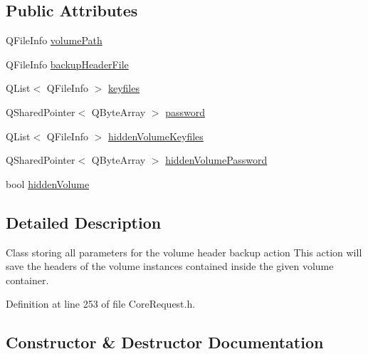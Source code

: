 \subsection*{Public Attributes}
\begin{DoxyCompactItemize}
\item 
Q\+File\+Info \hyperlink{struct_gost_crypt_1_1_core_1_1_backup_header_request_aa29012df2d35f163a525f2577f30ab49}{volume\+Path}
\item 
Q\+File\+Info \hyperlink{struct_gost_crypt_1_1_core_1_1_backup_header_request_af4c3d198df0113a58aede9649531bdf2}{backup\+Header\+File}
\item 
Q\+List$<$ Q\+File\+Info $>$ \hyperlink{struct_gost_crypt_1_1_core_1_1_backup_header_request_ae4b462b66c72cf07ef34574b6010f7fb}{keyfiles}
\item 
Q\+Shared\+Pointer$<$ Q\+Byte\+Array $>$ \hyperlink{struct_gost_crypt_1_1_core_1_1_backup_header_request_ae39396d46337be4935700059ed382916}{password}
\item 
Q\+List$<$ Q\+File\+Info $>$ \hyperlink{struct_gost_crypt_1_1_core_1_1_backup_header_request_a775c66c416d8fe75c6c446d3b9fd29ac}{hidden\+Volume\+Keyfiles}
\item 
Q\+Shared\+Pointer$<$ Q\+Byte\+Array $>$ \hyperlink{struct_gost_crypt_1_1_core_1_1_backup_header_request_aeed0cedac234914000bedb7b3d00425c}{hidden\+Volume\+Password}
\item 
bool \hyperlink{struct_gost_crypt_1_1_core_1_1_backup_header_request_a7a27003d28de62be2a7ff7e032f044e8}{hidden\+Volume}
\end{DoxyCompactItemize}


\subsection{Detailed Description}
Class storing all parameters for the volume header backup action This action will save the headers of the volume instances contained inside the given volume container. 

Definition at line 253 of file Core\+Request.\+h.



\subsection{Constructor \& Destructor Documentation}
\mbox{\label{struct_gost_crypt_1_1_core_1_1_backup_header_request_a5af656ceab0d38e0a47d46d0e02de1f7}} 
